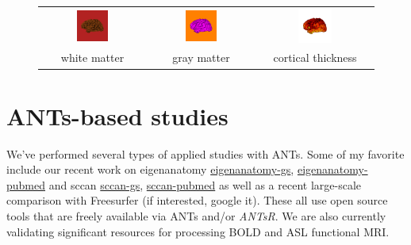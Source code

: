 \documentclass{InsightArticle}
\begin{document}
\begin{figure}
\centering
\begin{tabular}{ccc}
\includegraphics[width=0.315\textwidth]{Figures/OAS1_0457_MR1_mpr_n3_anon_sbj_111WhiteMatter.png} &
\includegraphics[width=0.315\textwidth]{Figures/OAS1_0457_MR1_mpr_n3_anon_sbj_111GrayMatter.png} &
\includegraphics[width=0.315\textwidth]{Figures/OAS1_0457_MR1_mpr_n3_anon_sbj_111CorticalThickness.png} \\
white matter & gray matter & cortical thickness
\end{tabular}
\label{fig:oasis_gm_wm}
\end{figure}



\newpage \newpage
\section{ANTs-based studies}
We've performed several types of applied studies with ANTs.  Some of
my favorite include our recent work on eigenanatomy
\href{http://scholar.google.com/scholar?q=eigenanatomy+avants&btnG=&hl=en&as_sdt=0%2C39}{eigenanatomy-gs},
\href{http://www.ncbi.nlm.nih.gov/pubmed/?term=eigenanatomy}{eigenanatomy-pubmed}
and sccan \href{http://scholar.google.com/scholar?q=canonical+correlation+avants&btnG=&hl=en&as_sdt=0%2C39}{sccan-gs},
\href{http://www.ncbi.nlm.nih.gov/pubmed/?term=canonical+correlation+avants}{sccan-pubmed} 
\href{}{} as well as a recent large-scale comparison with Freesurfer (if interested,
google it).  These all use open source tools that are freely available
via ANTs and/or \textit{ANTsR}.  We are also currently validating significant
resources for processing BOLD and ASL functional MRI.
\end{document}
